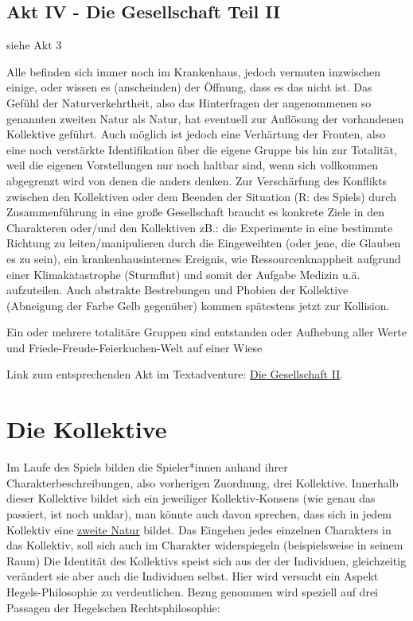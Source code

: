\documentclass[12pt, a4paper, openany]{report}
\let\tempone\itemize
\let\temptwo\enditemize
\renewenvironment{itemize}{\tempone\addtolength{\itemsep}{-0.5\baselineskip}}{\temptwo}
\begin{document}
\subsection{Akt IV - Die Gesellschaft Teil II}
\begin{itemize} 
\item[R]siehe Akt 3
\item[SR] Alle befinden sich immer noch im Krankenhaus, jedoch vermuten inzwischen einige, oder wissen es (anscheinden) der Öffnung, dass es das nicht ist.
  Das Gefühl der Naturverkehrtheit, also das Hinterfragen der angenommenen so genannten zweiten Natur als Natur, hat eventuell zur Auflösung der vorhandenen Kollektive geführt. 
    Auch möglich ist jedoch eine Verhärtung der Fronten, also eine noch verstärkte Identifikation über die eigene Gruppe bis hin zur Totalität, weil die eigenen Vorstellungen nur noch haltbar sind, wenn sich vollkommen abgegrenzt wird von denen die anders denken. 
    Zur Verschärfung des Konflikts zwischen den Kollektiven oder dem Beenden der Situation (R: des Spiels) durch Zusammenführung in eine große Gesellschaft braucht es konkrete Ziele in den Charakteren oder/und den Kollektiven zB.: 
    die Experimente in eine bestimmte Richtung zu leiten/manipulieren durch die Eingeweihten (oder jene, die Glauben es zu sein), ein krankenhausinternes Ereignis, wie Ressourcenknappheit aufgrund einer Klimakatastrophe (Sturmflut) und somit der  Aufgabe Medizin u.ä. aufzuteilen. 
    Auch abstrakte Bestrebungen und Phobien der Kollektive (Abneigung der Farbe Gelb gegenüber) kommen spätestens jetzt zur Kollision. 
\item[M] 
\item[P]Ein oder mehrere totalitäre Gruppen sind entstanden oder Aufhebung aller Werte und Friede-Freude-Feierkuchen-Welt auf einer Wiese
\end{itemize}

Link zum entsprechenden Akt im Textadventure: \hyperref[die-gesellschaft2]{Die Gesellschaft II}.

\section{Die Kollektive}
Im Laufe des Spiels bilden die Spieler*innen anhand ihrer Charakterbeschreibungen, also vorherigen Zuordnung, drei Kollektive. 
Innerhalb dieser Kollektive bildet sich ein jeweiliger Kollektiv-Konsens (wie genau das passiert, ist noch unklar), man könnte auch davon sprechen, dass sich in jedem Kollektiv eine \hyperref[zweite-natur]{\glqq zweite Natur\grqq{}} bildet. 
Das Eingehen jedes einzelnen Charakters in das Kollektiv, soll sich auch im Charakter widerspiegeln (beispielsweise in seinem Raum) 
Die Identität des Kollektivs speist sich aus der der Individuen, gleichzeitig verändert sie aber auch die Individuen selbst. 
Hier wird versucht ein Aspekt Hegels-Philosophie zu verdeutlichen. 
Bezug genommen wird speziell auf drei Passagen der Hegelschen Rechtsphilosophie: \\
\end{document}
